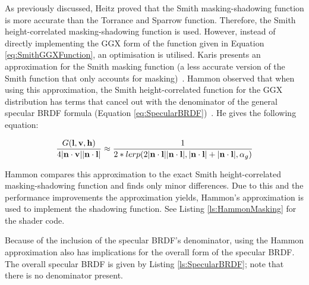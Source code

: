 
\vspace{-0.3cm}

As previously discussed, Heitz proved that the Smith masking-shadowing function is more accurate than the Torrance and Sparrow function. Therefore, the Smith height-correlated masking-shadowing function is used. However, instead of directly implementing the GGX form of the function given in Equation \ref{eq:SmithGGXFunction}, an optimisation is utilised. Karis presents an approximation for the Smith masking function (a less accurate version of the Smith function that only accounts for masking)~\cite{RealShadingInUnreal}. Hammon observed that when using this approximation, the Smith height-correlated function for the GGX distribution has terms that cancel out with the denominator of the general specular BRDF formula (Equation \ref{eq:SpecularBRDF})~\cite{HammonBRDF}. He gives the following equation:

\vspace{-0.2cm}

\begin{equation} \label{eq:HammonApproximation}
	\frac{G(\mathbf{l}, \mathbf{v}, \mathbf{h})}{4\abs{\mathbf{n}\cdot\mathbf{v}}\abs{\mathbf{n}\cdot\mathbf{l}}} \approx \frac{1}{2 * lerp(2\abs{\mathbf{n}\cdot\mathbf{l}}\abs{\mathbf{n}\cdot\mathbf{l}}, \abs{\mathbf{n}\cdot\mathbf{l}} + \abs{\mathbf{n}\cdot\mathbf{l}}, \alpha_g)}
\end{equation}

Hammon compares this approximation to the exact Smith height-correlated masking-shadowing function and finds only minor differences. Due to this and the performance improvements the approximation yields, Hammon's approximation is used to implement the shadowing function. See Listing \ref{ls:HammonMasking} for the shader code.

Because of the inclusion of the specular BRDF's denominator, using the Hammon approximation also has implications for the overall form of the specular BRDF. The overall specular BRDF is given by Listing \ref{ls:SpecularBRDF}; note that there is no denominator present.


